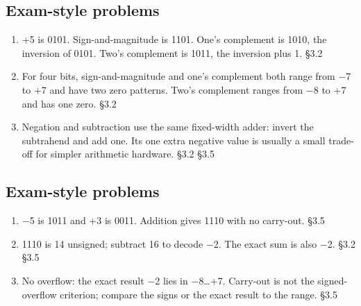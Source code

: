 \documentclass[11pt]{article}
\begin{document}
\begin{keepsection}\subsection{Exam-style problems}

\begin{enumerate}
\item +5 is 0101. Sign-and-magnitude is 1101. One’s complement is 1010, the inversion of 0101. Two’s complement is 1011, the inversion plus 1. \hfill{\small\color{FAUblue}§3.2}
\item For four bits, sign-and-magnitude and one’s complement both range from \ensuremath{-}7 to +7 and have two zero patterns. Two’s complement ranges from \ensuremath{-}8 to +7 and has one zero. \hfill{\small\color{FAUblue}§3.2}
\item Negation and subtraction use the same fixed-width adder: invert the subtrahend and add one. Its one extra negative value is usually a small trade-off for simpler arithmetic hardware. \hfill{\small\color{FAUblue}§3.2} \hfill{\small\color{FAUblue}§3.5}
\end{enumerate}

\end{keepsection}
\begin{keepsection}\subsection{Exam-style problems}

\begin{enumerate}
\item \ensuremath{-}5 is 1011 and +3 is 0011. Addition gives 1110 with no carry-out. \hfill{\small\color{FAUblue}§3.5}
\item 1110 is 14 unsigned; subtract 16 to decode \ensuremath{-}2. The exact sum is also \ensuremath{-}2. \hfill{\small\color{FAUblue}§3.2} \hfill{\small\color{FAUblue}§3.5}
\item No overflow: the exact result \ensuremath{-}2 lies in \ensuremath{-}8…+7. Carry-out is not the signed-overflow criterion; compare the signs or the exact result to the range. \hfill{\small\color{FAUblue}§3.5}
\end{enumerate}

\end{keepsection}
\end{document}
